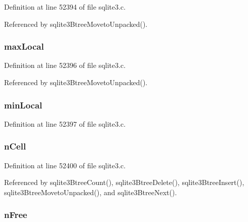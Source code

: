 Definition at line 52394 of file sqlite3.\+c.



Referenced by sqlite3\+Btree\+Moveto\+Unpacked().

\hypertarget{struct_mem_page_ae520370dc0940464a186684b0a9b5113}{}
\subsubsection[{max\+Local}]{ max\+Local}\label{struct_mem_page_ae520370dc0940464a186684b0a9b5113}


Definition at line 52396 of file sqlite3.\+c.



Referenced by sqlite3\+Btree\+Moveto\+Unpacked().

\hypertarget{struct_mem_page_acae49d06fe5c209d808832232cee4a00}{}
\subsubsection[{min\+Local}]{ min\+Local}\label{struct_mem_page_acae49d06fe5c209d808832232cee4a00}


Definition at line 52397 of file sqlite3.\+c.

\hypertarget{struct_mem_page_af6e66bd78bd9dfd8b79478b8aa086f09}{}
\subsubsection[{n\+Cell}]{ n\+Cell}\label{struct_mem_page_af6e66bd78bd9dfd8b79478b8aa086f09}


Definition at line 52400 of file sqlite3.\+c.



Referenced by sqlite3\+Btree\+Count(), sqlite3\+Btree\+Delete(), sqlite3\+Btree\+Insert(), sqlite3\+Btree\+Moveto\+Unpacked(), and sqlite3\+Btree\+Next().

\hypertarget{struct_mem_page_a8b19fe94efd4afc543f05f4e58603bcb}{}
\subsubsection[{n\+Free}]{ n\+Free}\label{struct_mem_page_a8b19fe94efd4afc543f05f4e58603bcb}


